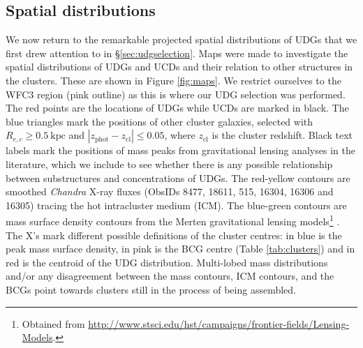 \documentclass[iop,tighten,twocolumn,apj,floatfix]{emulateapj}
\begin{document}
\subsection{Spatial distributions}\label{sec:spatialdist}

We now return to the remarkable projected spatial distributions of UDGs that
we first drew attention to in \S \ref{sec:udgselection}.
Maps were made to investigate the spatial distributions of UDGs and UCDs and
their relation to other structures in the clusters.
These are shown in Figure \ref{fig:maps}.
We restrict ourselves to the WFC3 region (pink outline) as this is where our
UDG selection was performed.
The red points are the locations of UDGs while UCDs are marked in black.
The blue triangles mark the positions of other cluster galaxies, selected with
$R_{e,c} \geq 0.5~\mathrm{kpc}$ and $|z_\mathrm{phot} - z_\mathrm{cl}| \leq
0.05$, where $z_\mathrm{cl}$ is the cluster redshift.
Black text labels mark the positions of mass peaks from gravitational lensing
analyses in the literature, which we include to see whether there is any possible
relationship between substructures and concentrations of UDGs.
The red-yellow contours are smoothed \textit{Chandra} X-ray fluxes
(ObsIDs 8477, 18611, 515, 16304, 16306 and 16305) tracing the hot
intracluster medium (ICM).
The blue-green contours are mass surface density contours from the Merten
gravitational lensing models\footnote{Obtained from
\url{http://www.stsci.edu/hst/campaigns/frontier-fields/Lensing-Models}.}
\citep{merten2009,merten2011,zitrin2009,zitrin2013}. 
The X's mark different possible definitions of the cluster centres: in
blue is the peak mass surface density, in pink is the BCG centre (Table
\ref{tab:clusters}) and in red is the centroid of the UDG distribution.
Multi-lobed mass distributions and/or any disagreement between the mass
contours, ICM contours, and the BCGs point towards clusters still in the
process of being assembled. 
\end{document}
